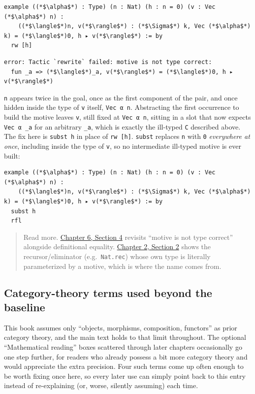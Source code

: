 \begin{lstlisting}
example ((*$\alpha$*) : Type) (n : Nat) (h : n = 0) (v : Vec (*$\alpha$*) n) :
    ((*$\langle$*)n, v(*$\rangle$*) : (*$\Sigma$*) k, Vec (*$\alpha$*) k) = (*$\langle$*)0, h ▸ v(*$\rangle$*) := by
  rw [h]
\end{lstlisting}

\begin{lstlisting}
error: Tactic `rewrite` failed: motive is not type correct:
  fun _a => (*$\langle$*)_a, v(*$\rangle$*) = (*$\langle$*)0, h ▸ v(*$\rangle$*)
\end{lstlisting}

\texttt{n} appears twice in the goal, once as the first component of the pair, and once hidden inside the type of \texttt{v} itself, \texttt{Vec α n}. Abstracting the first occurrence to build the motive leaves \texttt{v}, still fixed at \texttt{Vec α n}, sitting in a slot that now expects \texttt{Vec α \_\allowbreak{}a} for an arbitrary \texttt{\_\allowbreak{}a}, which is exactly the ill-typed \texttt{C} described above. The fix here is \texttt{subst h} in place of \texttt{rw [h]}. \texttt{subst} replaces \texttt{n} with \texttt{0} \emph{everywhere at once}, including inside the type of \texttt{v}, so no intermediate ill-typed motive is ever built:

\begin{lstlisting}
example ((*$\alpha$*) : Type) (n : Nat) (h : n = 0) (v : Vec (*$\alpha$*) n) :
    ((*$\langle$*)n, v(*$\rangle$*) : (*$\Sigma$*) k, Vec (*$\alpha$*) k) = (*$\langle$*)0, h ▸ v(*$\rangle$*) := by
  subst h
  rfl
\end{lstlisting}

\begin{quote}
Read more. \hyperref[sec:06-rigor-check:04-defeq-vs-propeq:1]{Chapter 6, Section 4} revisits ``motive is not type correct'' alongside definitional equality. \hyperref[sec:02-terminology-and-coc:02-pi-sigma-and-coc:1]{Chapter 2, Section 2} shows the recursor/eliminator (e.g.~\texttt{Nat.rec}) whose own type is literally parameterized by a motive, which is where the name comes from.
\end{quote}

\subsection{Category-theory terms used beyond the baseline}\label{sec:02-terminology-and-coc:01-terminology:6}

This book assumes only ``objects, morphisms, composition, functors'' as prior category theory, and the main text holds to that limit throughout. The optional ``Mathematical reading'' boxes scattered through later chapters occasionally go one step further, for readers who already possess a bit more category theory and would appreciate the extra precision. Four such terms come up often enough to be worth fixing once here, so every later use can simply point back to this entry instead of re-explaining (or, worse, silently assuming) each time.

